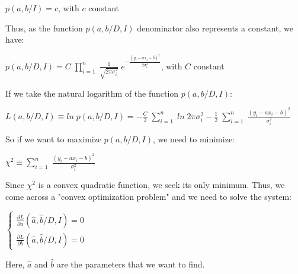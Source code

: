 \documentclass{article}
\begin{document}
$p(a,b/I) = c$, with $c$ constant

\hfill

Thus, as the function $p(a,b/D,I)$ denominator also represents a constant, we have:

\hfill

$p(a,b/D,I) = C \; \prod\limits_{i = 1}^{n} \; \frac{1}{\sqrt{2 \pi \sigma_{i}^{2}}} \; e^{-\frac{(y_{i} - ax_{i} - b)^{2}}{2 \sigma_{i}^{2}}}$, with $C$ constant

\hfill

If we take the natural logarithm of the function $p(a,b/D,I)$:

\hfill

$L(a,b/D,I) \equiv ln \; p(a,b/D,I) = - \frac{C}{2} \; \sum\limits_{i = 1}^{n} \; ln \; 2 \pi \sigma_{i}^{2} - \frac{1}{2} \; \sum\limits_{i = 1}^{n} \; \frac{(y_{i} - ax_{i} - b)^{2}}{\sigma_{i}^{2}}$

\hfill

So if we want to maximize $p(a,b/D,I)$, we need to minimize:

\hfill

$\chi^{2} \equiv \sum\limits_{i = 1}^{n} \; \frac{(y_{i} - ax_{i} - b)^{2}}{\sigma_{i}^{2}}$

\hfill

Since $\chi^{2}$ is a convex quadratic function, we seek its only minimum. Thus, we come across a "convex optimization problem" and we need to solve the system:

\hfill

$\begin{cases} \frac{\partial L}{\partial a} (\hat{a},\hat{b}/D,I) = 0 \\ \frac{\partial L}{\partial b} (\hat{a},\hat{b}/D,I) = 0 \end{cases}$

\hfill

Here, $\hat{a}$ and $\hat{b}$ are the parameters that we want to find.
\end{document}

